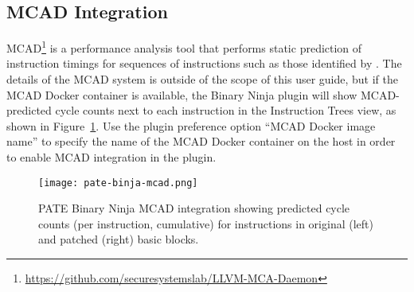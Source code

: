 \subsection{MCAD Integration}

MCAD\footnote{\url{https://github.com/securesystemslab/LLVM-MCA-Daemon}} is a performance analysis tool that performs static prediction of instruction timings for sequences of instructions such as those identified by \pate{}.
The details of the MCAD system is outside of the scope of this user guide, but if the MCAD Docker container is available, the \pate{} Binary Ninja plugin will show MCAD-predicted cycle counts next to each instruction in the Instruction Trees view, as shown in Figure~\ref{fig:mcad}.
Use the \pate{} plugin preference option ``MCAD Docker image name'' to specify the name of the MCAD Docker container on the host in order to enable MCAD integration in the \pate{} plugin.

\begin{figure}[h]
  \centering
  \texttt{[image: pate-binja-mcad.png]}
  \caption{PATE Binary Ninja MCAD integration showing predicted cycle counts (per instruction, cumulative) for instructions in original (left) and patched (right) basic blocks.}
  \label{fig:mcad}
\end{figure}